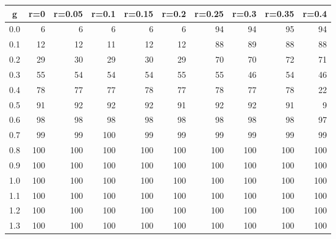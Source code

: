 %
\begin{table}[!tbp]
 \begin{center}
 \begin{tabular}{rrrrrrrrrr}\hline\hline
\multicolumn{1}{c}{g}&\multicolumn{1}{c}{r=0}&\multicolumn{1}{c}{r=0.05}&\multicolumn{1}{c}{r=0.1}&\multicolumn{1}{c}{r=0.15}&\multicolumn{1}{c}{r=0.2}&\multicolumn{1}{c}{r=0.25}&\multicolumn{1}{c}{r=0.3}&\multicolumn{1}{c}{r=0.35}&\multicolumn{1}{c}{r=0.4}\tabularnewline
\hline
0.0&  6&  6&  6&  6&  6& 94& 94& 95& 94\tabularnewline
0.1& 12& 12& 11& 12& 12& 88& 89& 88& 88\tabularnewline
0.2& 29& 30& 29& 30& 29& 70& 70& 72& 71\tabularnewline
0.3& 55& 54& 54& 54& 55& 55& 46& 54& 46\tabularnewline
0.4& 78& 77& 77& 78& 77& 78& 77& 78& 22\tabularnewline
0.5& 91& 92& 92& 92& 91& 92& 92& 91&  9\tabularnewline
0.6& 98& 98& 98& 98& 98& 98& 98& 98& 97\tabularnewline
0.7& 99& 99&100& 99& 99& 99& 99& 99& 99\tabularnewline
0.8&100&100&100&100&100&100&100&100&100\tabularnewline
0.9&100&100&100&100&100&100&100&100&100\tabularnewline
1.0&100&100&100&100&100&100&100&100&100\tabularnewline
1.1&100&100&100&100&100&100&100&100&100\tabularnewline
1.2&100&100&100&100&100&100&100&100&100\tabularnewline
1.3&100&100&100&100&100&100&100&100&100\tabularnewline
\hline
\end{tabular}

\end{center}

\end{table}

